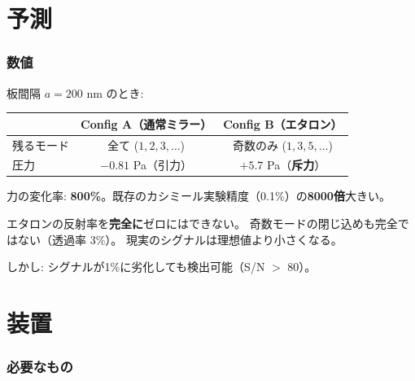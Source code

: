 \documentclass[12pt,a4paper]{article}
\begin{document}
\part{予測}

\section{数値}

\begin{resultbox}[定量的予測]
板間隔 $a = 200$ nm のとき:

\begin{center}
\renewcommand{\arraystretch}{1.3}
\begin{tabular}{lcc}
\toprule
 & Config A（通常ミラー） & Config B（エタロン） \\
\midrule
残るモード & 全て ($1,2,3,\ldots$) & 奇数のみ ($1,3,5,\ldots$) \\
圧力 & $-0.81$ Pa（引力） & $+5.7$ Pa（\textbf{斥力}） \\
\bottomrule
\end{tabular}
\end{center}

力の変化率: \textbf{800\%}。既存のカシミール実験精度（0.1\%）の\textbf{8000倍}大きい。
\end{resultbox}

\begin{honestbox}[これは理想化した計算]
エタロンの反射率を\textbf{完全に}ゼロにはできない。
奇数モードの閉じ込めも完全ではない（透過率 3\%）。
現実のシグナルは理想値より小さくなる。

しかし: シグナルが1\%に劣化しても検出可能（S/N $>$ 80）。
\end{honestbox}

\part{装置}

\section{必要なもの}
\end{document}
